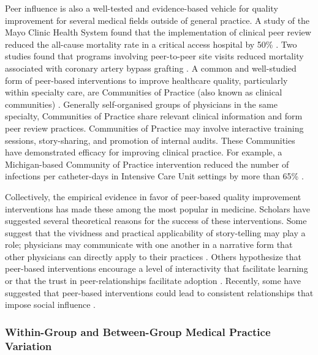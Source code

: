 \documentclass[12pt]{article}
\begin{document}
Peer influence is also a well-tested and evidence-based vehicle for quality improvement for several medical fields outside of general practice. A study of the Mayo Clinic Health System found that the implementation of clinical peer review reduced the all-cause mortality rate in a critical access hospital by 50\% \citep{deyo-svendsenSystematicApproachClinical2016}. Two studies found that programs involving peer-to-peer site visits reduced mortality associated with coronary artery bypass grafting \citep{holmanAlabamaCoronaryArtery2001a,oconnorRegionalInterventionImprove1996}. A common and well-studied form of peer-based interventions to improve healthcare quality, particularly within specialty care, are Communities of Practice (also known as clinical communities) \citep{avelingQualityImprovementClinical2012,endsleyWorkingTogetherCommunities2005,iedemaEmergentModesWork2005}. Generally self-organised groups of physicians in the same specialty, Communities of Practice share relevant clinical information and form peer review practices. Communities of Practice may involve interactive training sessions, story-sharing, and promotion of internal audits. These Communities have demonstrated efficacy for improving clinical practice. For example, a Michigan-based Community of Practice intervention reduced the number of infections per catheter-days in Intensive Care Unit settings by more than 65\% \citep{pronovostSustainingReductionsCentral2016}.

Collectively, the empirical evidence in favor of peer-based quality improvement interventions has made these among the most popular in medicine. Scholars have suggested several theoretical reasons for the success of these interventions. Some suggest that the vividness and practical applicability of story-telling may play a role; physicians may communicate with one another in a narrative form that other physicians can directly apply to their practices \citep{jordanRoleConversationHealth2009}. Others hypothesize that peer-based interventions encourage a level of interactivity that facilitate learning \citep{johnsonNextRevolutionInteractions2005} or that the trust in peer-relationships facilitate adoption \citep{wengerCommunitiesPracticeLearning1999}. Recently, some have suggested that peer-based interventions could lead to consistent relationships that impose social influence \citep{meltzerExploringUseSocial2010}.


\subsubsection{Within-Group and Between-Group Medical Practice Variation}
\end{document}
